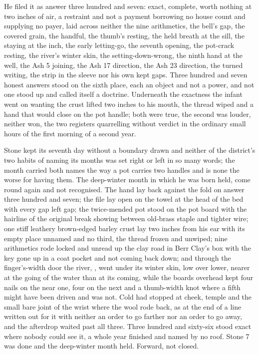 He filed it as answer three hundred and seven: exact, complete, worth nothing at two inches of air, a restraint and not a payment borrowing no house count and supplying no payer, laid across neither the nine arithmetics, the bell's gap, the covered grain, the handful, the thumb's resting, the held breath at the sill, the staying at the inch, the early letting-go, the seventh opening, the pot-crack resting, the river's winter skin, the setting-down-wrong, the ninth hand at the well, the Ash 5 joining, the Ash 17 direction, the Ash 23 direction, the turned writing, the strip in the sleeve nor his own kept gaps. Three hundred and seven honest answers stood on the sixth place, each an object and not a power, and not one stood up and called itself a doctrine. Underneath the exactness the infant went on wanting the crust lifted two inches to his mouth, the thread wiped and a hand that would close on the pot handle; both were true, the second was louder, neither won, the two registers quarrelling without verdict in the ordinary small hours of the first morning of a second year.

Stone kept its seventh day without a boundary drawn and neither of the district's two habits of naming its months was set right or left in so many words; the month carried both names the way a pot carries two handles and is none the worse for having them. The deep-winter month in which he was born held, come round again and not recognised. The hand lay back against the fold on answer three hundred and seven; the file lay open on the towel at the head of the bed with every gap left gap; the twice-mended pot stood on the pot board with the hairline of the original break showing between old-brass staple and tighter wire; one stiff leathery brown-edged barley crust lay two inches from his ear with its empty place unnamed and no third, the thread frozen and unwiped; nine arithmetics rode locked and unread up the clay road in Berr Clay's box with the key gone up in a coat pocket and not coming back down; and through the finger's-width door the river, , went under its winter skin, low over lower, nearer at the going of the water than at its coming, while the boards overhead kept four nails on the near one, four on the next and a thumb-width knot where a fifth might have been driven and was not. Cold had stopped at cheek, temple and the small bare joint of the wrist where the wool rode back, as at the end of a line written out for it with neither an order to go farther nor an order to go away, and the afterdrop waited past all three. Three hundred and sixty-six stood exact where nobody could see it, a whole year finished and named by no roof. Stone 7 was done and the deep-winter month held. Forward, not closed.
